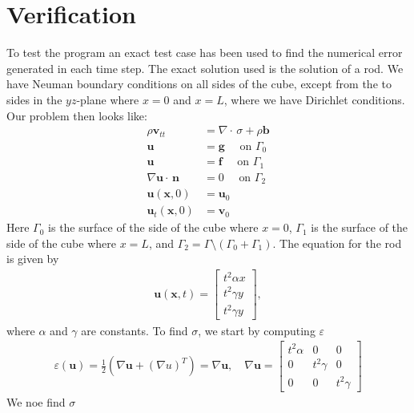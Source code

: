 \documentclass[twoside]{article}
\begin{document}
\section{Verification}
To test the program an exact test case has been used to find the numerical error generated in each time step. 
The exact solution used is the solution of a rod. We have Neuman boundary conditions on all sides of the cube, except from the to sides in the \( yz\)-plane where \( x= 0\) and \( x = L\), where we have Dirichlet conditions. Our problem then looks like:
\begin{align*}
	\rho \mathbf{v}_{tt} &= \nabla \cdot \,\sigma + \rho \mathbf{b}\\
	\mathbf{u} &= \mathbf{g} \quad \text{ on } \Gamma_0 \\
	\mathbf{u} &= \mathbf{f} \quad \text{ on } \Gamma_1 \\
	\nabla \mathbf{u} \cdot \, \mathbf{n} &= 0 \quad \text{ on } \Gamma_2 \\
	\mathbf{u}(\mathbf{x}, 0) &= \mathbf{u}_0 \\
	\mathbf{u}_t(\mathbf{x}, 0) &= \mathbf{v}_0 
\end{align*}
Here \( \Gamma_0\) is the surface of the side of the cube where \( x = 0\), \( \Gamma_1\) is the surface of the side of the cube where \( x = L\), and \( \Gamma_2 = \Gamma \setminus (\Gamma_0 + \Gamma_1) \).
The equation for the rod is given by
\begin{align}
\label{eq:rod_u}
 \mathbf{u}(\mathbf{x}, t) = 
 			\begin{bmatrix}
				t^2 \alpha x \\
				t^2 \gamma y \\
				t^2 \gamma y
			\end{bmatrix},
\end{align}
where \( \alpha\) and \( \gamma\) are constants.
To find \( \sigma\), we start by computing \( \varepsilon\)
\begin{align*}
	\varepsilon(\mathbf{u}) = \frac{1}{2}(\nabla \mathbf{u} + (\nabla u)^T) = \nabla \mathbf{u}, \quad
	\nabla \mathbf{u} = 
			\begin{bmatrix}
				t^2 \alpha    & 0 & 0 \\
				0 & t^2 \gamma & 0 \\
				0 & 0 & t^2 \gamma
			\end{bmatrix}
\end{align*}
We noe find \( \sigma\)
\end{document}
